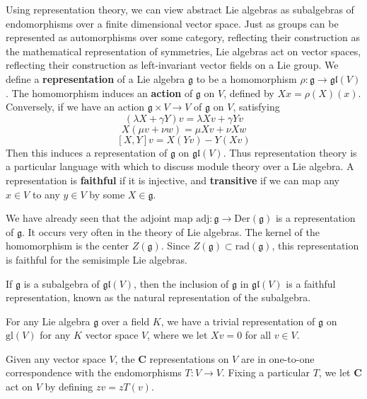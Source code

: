 Using representation theory, we can view abstract Lie algebras as subalgebras of endomorphisms over a finite dimensional vector space. Just as groups can be represented as automorphisms over some category, reflecting their construction as the mathematical representation of symmetries, Lie algebras act on vector spaces, reflecting their construction as left-invariant vector fields on a Lie group. We define a {\bf representation} of a Lie algebra $\mathfrak{g}$ to be a homomorphism $\rho: \mathfrak{g} \to \mathfrak{gl}(V)$. The homomorphism induces an {\bf action} of $\mathfrak{g}$ on $V$, defined by $Xx = \rho(X)(x)$. Conversely, if we have an action $\mathfrak{g} \times V \to V$ of $\mathfrak{g}$ on $V$, satisfying
%
\[ (\lambda X + \gamma Y)v = \lambda Xv + \gamma Yv \]
\[ X(\mu v + \nu w) = \mu Xv + \nu Xw \]
\[ [X,Y] v = X(Yv) - Y(Xv) \]
%
Then this induces a representation of $\mathfrak{g}$ on $\mathfrak{gl}(V)$. Thus representation theory is a particular language with which to discuss module theory over a Lie algebra. A representation is {\bf faithful} if it is injective, and {\bf transitive} if we can map any $x \in V$ to any $y \in V$ by some $X \in \mathfrak{g}$.

\begin{example}
    We have already seen that the adjoint map $\text{adj}: \mathfrak{g} \to \text{Der}(\mathfrak{g})$ is a representation of $\mathfrak{g}$. It occurs very often in the theory of Lie algebras. The kernel of the homomorphism is the center $Z(\mathfrak{g})$. Since $Z(\mathfrak{g}) \subset \text{rad}(\mathfrak{g})$, this representation is faithful for the semisimple Lie algebras.
\end{example}

\begin{example}
    If $\mathfrak{g}$ is a subalgebra of $\mathfrak{gl}(V)$, then the inclusion of $\mathfrak{g}$ in $\mathfrak{gl}(V)$ is a faithful representation, known as the natural representation of the subalgebra.
\end{example}

\begin{example}
    For any Lie algebra $\mathfrak{g}$ over a field $K$, we have a trivial representation of $\mathfrak{g}$ on $\text{gl}(V)$ for any $K$ vector space $V$, where we let $Xv = 0$ for all $v \in V$.
\end{example}

\begin{example}
    Given any vector space $V$, the $\mathbf{C}$ representations on $V$ are in one-to-one correspondence with the endomorphisms $T: V \to V$. Fixing a particular $T$, we let $\mathbf{C}$ act on $V$ by defining $zv = zT(v)$.
\end{example}

